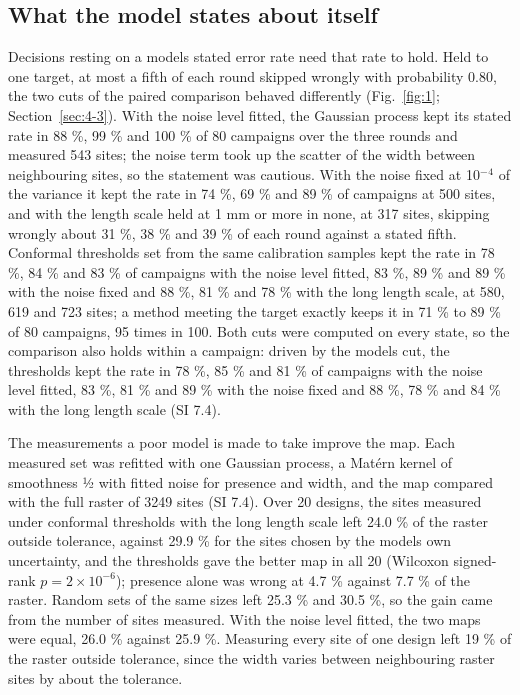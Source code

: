 \documentclass{iopjournal}
\begin{document}
\hypertarget{sec:5-2}{%
\subsection{What the model states about itself}\label{sec:5-2}}

Decisions resting on a model\textquotesingle s stated error rate need that rate to hold. Held to one target, at most a fifth of each round skipped wrongly with probability 0.80, the two cuts of the paired comparison behaved differently (Fig.~\ref{fig:1}; Section~\ref{sec:4-3}). With the noise level fitted, the Gaussian process kept its stated rate in 88 \%, 99 \% and 100 \% of 80 campaigns over the three rounds and measured 543 sites; the noise term took up the scatter of the width between neighbouring sites, so the statement was cautious. With the noise fixed at 10\ensuremath{^{-}}\ensuremath{^{4}} of the variance it kept the rate in 74 \%, 69 \% and 89 \% of campaigns at 500 sites, and with the length scale held at 1 mm or more in none, at 317 sites, skipping wrongly about 31 \%, 38 \% and 39 \% of each round against a stated fifth. Conformal thresholds set from the same calibration samples kept the rate in 78 \%, 84 \% and 83 \% of campaigns with the noise level fitted, 83 \%, 89 \% and 89 \% with the noise fixed and 88 \%, 81 \% and 78 \% with the long length scale, at 580, 619 and 723 sites; a method meeting the target exactly keeps it in 71 \% to 89 \% of 80 campaigns, 95 times in 100. Both cuts were computed on every state, so the comparison also holds within a campaign: driven by the model\textquotesingle s cut, the thresholds kept the rate in 78 \%, 85 \% and 81 \% of campaigns with the noise level fitted, 83 \%, 81 \% and 89 \% with the noise fixed and 88 \%, 78 \% and 84 \% with the long length scale (SI 7.4).

The measurements a poor model is made to take improve the map. Each measured set was refitted with one Gaussian process, a Matérn kernel of smoothness ½ with fitted noise for presence and width, and the map compared with the full raster of 3249 sites (SI 7.4). Over 20 designs, the sites measured under conformal thresholds with the long length scale left 24.0 \% of the raster outside tolerance, against 29.9 \% for the sites chosen by the model\textquotesingle s own uncertainty, and the thresholds gave the better map in all 20 (Wilcoxon signed-rank \(p = 2 \times 10^{-6}\)); presence alone was wrong at 4.7 \% against 7.7 \% of the raster. Random sets of the same sizes left 25.3 \% and 30.5 \%, so the gain came from the number of sites measured. With the noise level fitted, the two maps were equal, 26.0 \% against 25.9 \%. Measuring every site of one design left 19 \% of the raster outside tolerance, since the width varies between neighbouring raster sites by about the tolerance.
\end{document}
